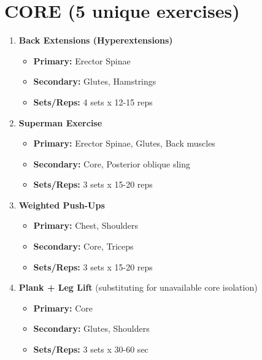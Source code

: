 \documentclass{article}
\begin{document}
\section*{CORE (5 unique exercises)}
\begin{enumerate}[label=\arabic*., wide=0pt, leftmargin=*]
    \item \textbf{Back Extensions (Hyperextensions)}
        \begin{itemize}[label=\textbullet, leftmargin=*, nosep, topsep=0pt, partopsep=0pt]
            \item \textbf{Primary:} Erector Spinae
            \item \textbf{Secondary:} Glutes, Hamstrings
            \item \textbf{Sets/Reps:} 4 sets x 12-15 reps
        \end{itemize}

    \item \textbf{Superman Exercise}
        \begin{itemize}[label=\textbullet, leftmargin=*, nosep, topsep=0pt, partopsep=0pt]
            \item \textbf{Primary:} Erector Spinae, Glutes, Back muscles
            \item \textbf{Secondary:} Core, Posterior oblique sling
            \item \textbf{Sets/Reps:} 3 sets x 15-20 reps
        \end{itemize}

    \item \textbf{Weighted Push-Ups}
        \begin{itemize}[label=\textbullet, leftmargin=*, nosep, topsep=0pt, partopsep=0pt]
            \item \textbf{Primary:} Chest, Shoulders
            \item \textbf{Secondary:} Core, Triceps
            \item \textbf{Sets/Reps:} 3 sets x 15-20 reps
        \end{itemize}

    \item \textbf{Plank + Leg Lift} (substituting for unavailable core isolation)
        \begin{itemize}[label=\textbullet, leftmargin=*, nosep, topsep=0pt, partopsep=0pt]
            \item \textbf{Primary:} Core
            \item \textbf{Secondary:} Glutes, Shoulders
            \item \textbf{Sets/Reps:} 3 sets x 30-60 sec
        \end{itemize}


\end{enumerate}
\end{document}
